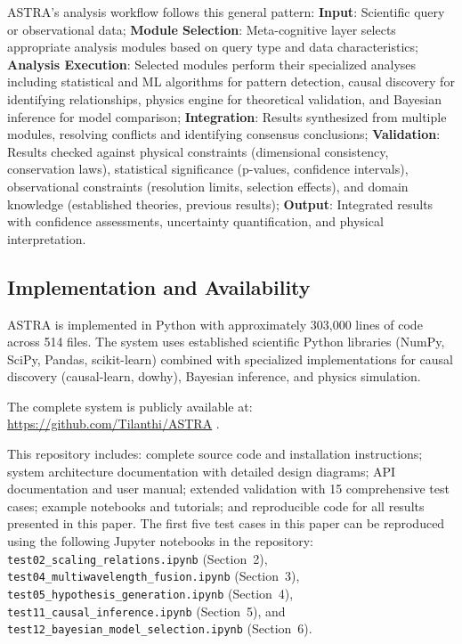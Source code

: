 \documentclass[usenatbib]{rasti}
\begin{document}
ASTRA's analysis workflow follows this general pattern: \textbf{Input}: Scientific query or observational data; \textbf{Module Selection}: Meta-cognitive layer selects appropriate analysis modules based on query type and data characteristics; \textbf{Analysis Execution}: Selected modules perform their specialized analyses including statistical and ML algorithms for pattern detection, causal discovery for identifying relationships, physics engine for theoretical validation, and Bayesian inference for model comparison; \textbf{Integration}: Results synthesized from multiple modules, resolving conflicts and identifying consensus conclusions; \textbf{Validation}: Results checked against physical constraints (dimensional consistency, conservation laws), statistical significance (p-values, confidence intervals), observational constraints (resolution limits, selection effects), and domain knowledge (established theories, previous results); \textbf{Output}: Integrated results with confidence assessments, uncertainty quantification, and physical interpretation.

\subsection{Implementation and Availability}

ASTRA is implemented in Python with approximately 303,000 lines of code across 514 files. The system uses established scientific Python libraries (NumPy, SciPy, Pandas, scikit-learn) combined with specialized implementations for causal discovery (causal-learn, dowhy), Bayesian inference, and physics simulation.

The complete system is publicly available at: \url{https://github.com/Tilanthi/ASTRA} \cite{astra_github}.

This repository includes: complete source code and installation instructions; system architecture documentation with detailed design diagrams; API documentation and user manual; extended validation with 15 comprehensive test cases; example notebooks and tutorials; and reproducible code for all results presented in this paper. The first five test cases in this paper can be reproduced using the following Jupyter notebooks in the repository: \texttt{test02\_scaling\_relations.ipynb} (Section~2), \texttt{test04\_multiwavelength\_fusion.ipynb} (Section~3), \texttt{test05\_hypothesis\_generation.ipynb} (Section~4), \texttt{test11\_causal\_inference.ipynb} (Section~5), and \texttt{test12\_bayesian\_model\_selection.ipynb} (Section~6).
\end{document}
